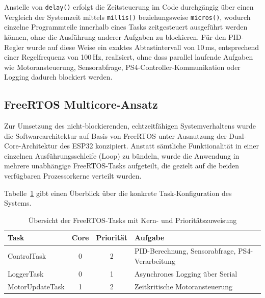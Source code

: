 \documentclass[12pt,ngerman,numbers=noenddot,abstracton,headsepline]{scrreprt}
\begin{document}
Anstelle von \texttt{delay()} erfolgt die Zeitsteuerung im Code durchgängig über einen Vergleich der Systemzeit mittels \texttt{millis()} beziehungsweise \texttt{micros()}, wodurch einzelne Programmteile innerhalb eines Tasks zeitgesteuert ausgeführt werden können, ohne die Ausführung anderer Aufgaben zu blockieren. Für den PID-Regler wurde auf diese Weise ein exaktes Abtastintervall von 10\,ms, entsprechend einer Regelfrequenz von 100\,Hz, realisiert, ohne dass parallel laufende Aufgaben wie Motoransteuerung, Sensorabfrage, PS4-Controller-Kommunikation oder Logging dadurch blockiert werden.

\subsection{FreeRTOS Multicore-Ansatz}
\label{subsec:freertos_multicore}

Zur Umsetzung des nicht-blockierenden, echtzeitfähigen Systemverhaltens wurde die Softwarearchitektur auf Basis von FreeRTOS unter Ausnutzung der Dual-Core-Architektur des ESP32 konzipiert. Anstatt sämtliche Funktionalität in einer einzelnen Ausführungsschleife (Loop) zu bündeln, wurde die Anwendung in mehrere unabhängige FreeRTOS-Tasks aufgeteilt, die gezielt auf die beiden verfügbaren Prozessorkerne verteilt wurden.

Tabelle~\ref{tab:freertos_tasks} gibt einen Überblick über die konkrete Task-Konfiguration des Systems.

\begin{table}[h]
    \centering
    \caption{Übersicht der FreeRTOS-Tasks mit Kern- und Prioritätszuweisung}
    \label{tab:freertos_tasks}
    \begin{tabular}{|l|c|c|l|}
        \hline
        \textbf{Task} & \textbf{Core} & \textbf{Priorität} & \textbf{Aufgabe} \\
        \hline
        ControlTask & 0 & 2 & PID-Berechnung, Sensorabfrage, PS4-Verarbeitung \\
        \hline
        LoggerTask & 0 & 1 & Asynchrones Logging über Serial \\
        \hline
        MotorUpdateTask & 1 & 2 & Zeitkritische Motoransteuerung \\
        \hline
    \end{tabular}
\end{table}
\end{document}
